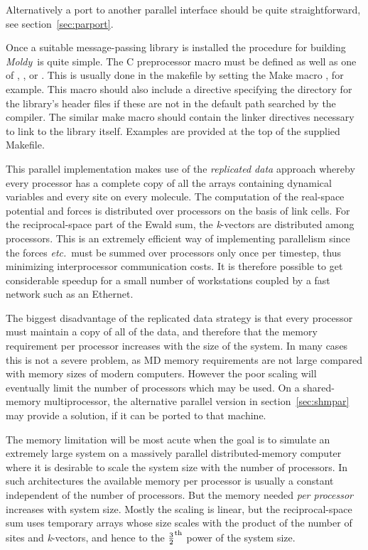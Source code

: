 \documentclass[a4paper,twoside]{report}
\newcommand{\Fname}[1]{{\upshape\mdseries\sffamily#1}}
\newcommand{\moldy}{\emph{Moldy}}
\newcommand{\etc}{\emph{etc.}}
\begin{document}
\noindent
Alternatively a port to another parallel interface should be quite
straightforward, see section~\ref{sec:parport}.

Once a suitable message-passing library is installed the procedure for
building \moldy\ is quite simple.  The C preprocessor macro
 must be defined as well as one of ,
,  or . This is usually done
in the makefile by setting the Make macro , for example.  This macro should also include a 
directive specifying the directory for the library's header files if
these are not in the default path searched by the compiler.  The
similar make macro  should contain the linker
directives necessary to link to the library itself. Examples are
provided at the top of the supplied \Fname{Makefile}.

This parallel implementation makes use of the \emph{replicated data}
approach\cite{smith:91} whereby every processor has a complete copy of
all the arrays containing dynamical variables and every site on every
molecule.  The computation of the real-space potential and forces is
distributed over processors on the basis of link cells.  For the
reciprocal-space part of the Ewald sum, the \emph{k}-vectors are
distributed among processors.  This is an extremely efficient way of
implementing parallelism since the forces \etc\ must be summed over
processors only once per timestep, thus minimizing interprocessor
communication costs.  It is therefore possible to get considerable
speedup for a small number of workstations coupled by a fast network
such as an Ethernet.

The biggest disadvantage of the replicated data strategy is that
every processor must maintain a copy of all of the data, and therefore
that the memory requirement per processor increases with the size of
the system.   In many cases this is not a severe problem, as MD
memory requirements are not large compared with memory sizes of modern
computers.  However the poor scaling will eventually limit the number
of processors which may be used.  On a shared-memory multiprocessor,
the alternative parallel version in section~\ref{sec:shmpar} may
provide a solution, if it can be ported to that machine.

The memory limitation will be most acute when the goal is to simulate
an extremely large system on a massively parallel distributed-memory
computer where it is desirable to scale the system size with the
number of processors.  In such architectures the available memory per
processor is usually a constant independent of the number of
processors. But the memory needed \emph{per processor} increases with
system size.  Mostly the scaling is linear, but the reciprocal-space
sum uses temporary arrays whose size scales with the product of the
number of sites and \emph{k}-vectors, and hence to the
{\small$\frac{3}{2}^{\textnormal{th}}$} power of the system size.
\end{document}
